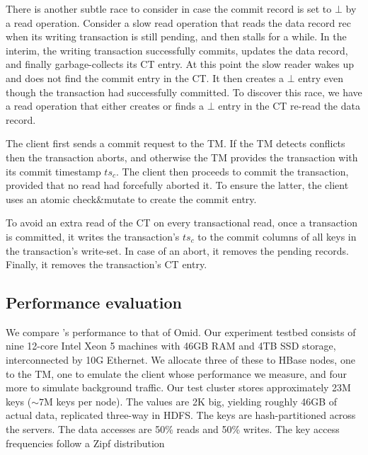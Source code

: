 There is  another subtle race to consider in case the commit record is set to $\bot$ by a read operation. 
Consider a slow read operation that reads the data record rec when its writing transaction is still pending, and then stalls
for a while. In the interim, the writing transaction successfully commits, updates the data record, 
and finally garbage-collects its  CT entry.  At this point the slow reader wakes up 
and does not find the commit entry in the CT. It then creates a $\bot$ entry even though the transaction had successfully committed.
To discover this race, we have a read operation that either creates or finds a $\bot$ entry in the CT re-read the data record.

The client first 
sends a commit request to the TM. 
If the TM detects conflicts then the transaction aborts, and otherwise the TM provides the transaction with its commit  timestamp $ts_c$. 
The client then proceeds to commit the transaction, provided that no read had forcefully aborted  it. To ensure the latter, the client uses 
an atomic {check\&mutate} to create the commit entry. 

To avoid an extra read of the CT on every transactional read, once a transaction is committed, it writes 
the transaction's $ts_c$ to the commit columns of all keys in  the transaction's write-set. 
In case of an abort, it removes the pending records.
Finally, it removes the transaction's CT entry. 




\subsection{Performance evaluation}
\label{ssec:ll-graphs} 

We compare \sysll's performance to that of Omid. 
Our experiment testbed consists of nine 12-core Intel Xeon 5 machines with 46GB RAM and 4TB 
SSD storage, interconnected by 10G Ethernet. We allocate three of these to HBase nodes, 
one to the TM, one to emulate the client whose performance we measure, and four more to simulate 
background traffic.  
Our test cluster stores approximately 23M keys ($\sim\!\!7$M keys per node). 
The values are 2K big, yielding roughly 46GB of actual data, replicated three-way in HDFS. The keys are hash-partitioned
across the servers. The data accesses are 50\% reads and 
50\% writes. The key access frequencies follow a Zipf distribution

